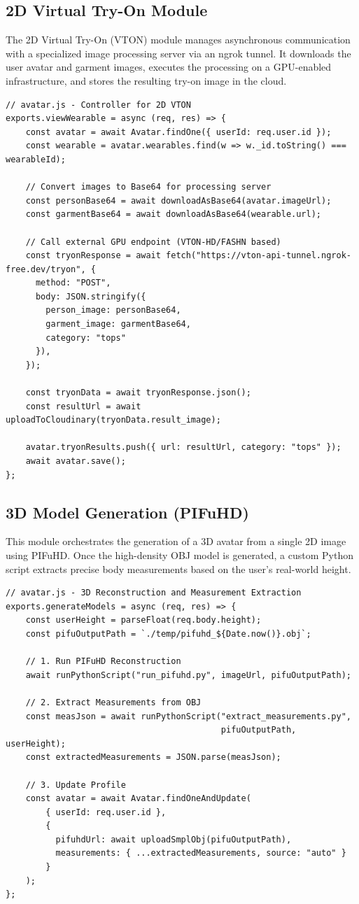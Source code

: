 \documentclass[12pt,a4paper,oneside]{report}
\begin{document}
\subsection{2D Virtual Try-On Module}
The 2D Virtual Try-On (VTON) module manages asynchronous communication with a specialized image processing server via an ngrok tunnel. It downloads the user avatar and garment images, executes the processing on a GPU-enabled infrastructure, and stores the resulting try-on image in the cloud.

\begin{verbatim}
// avatar.js - Controller for 2D VTON
exports.viewWearable = async (req, res) => {
    const avatar = await Avatar.findOne({ userId: req.user.id });
    const wearable = avatar.wearables.find(w => w._id.toString() === wearableId);
    
    // Convert images to Base64 for processing server
    const personBase64 = await downloadAsBase64(avatar.imageUrl);
    const garmentBase64 = await downloadAsBase64(wearable.url);

    // Call external GPU endpoint (VTON-HD/FASHN based)
    const tryonResponse = await fetch("https://vton-api-tunnel.ngrok-free.dev/tryon", {
      method: "POST",
      body: JSON.stringify({
        person_image: personBase64,
        garment_image: garmentBase64,
        category: "tops"
      }),
    });

    const tryonData = await tryonResponse.json();
    const resultUrl = await uploadToCloudinary(tryonData.result_image);
    
    avatar.tryonResults.push({ url: resultUrl, category: "tops" });
    await avatar.save();
};
\end{verbatim}

\subsection{3D Model Generation (PIFuHD)}
This module orchestrates the generation of a 3D avatar from a single 2D image using PIFuHD. Once the high-density OBJ model is generated, a custom Python script extracts precise body measurements based on the user's real-world height.

\begin{verbatim}
// avatar.js - 3D Reconstruction and Measurement Extraction
exports.generateModels = async (req, res) => {
    const userHeight = parseFloat(req.body.height);
    const pifuOutputPath = `./temp/pifuhd_${Date.now()}.obj`;

    // 1. Run PIFuHD Reconstruction
    await runPythonScript("run_pifuhd.py", imageUrl, pifuOutputPath);

    // 2. Extract Measurements from OBJ
    const measJson = await runPythonScript("extract_measurements.py", 
                                           pifuOutputPath, userHeight);
    const extractedMeasurements = JSON.parse(measJson);

    // 3. Update Profile
    const avatar = await Avatar.findOneAndUpdate(
        { userId: req.user.id },
        { 
          pifuhdUrl: await uploadSmplObj(pifuOutputPath),
          measurements: { ...extractedMeasurements, source: "auto" }
        }
    );
};
\end{verbatim}
\end{document}
